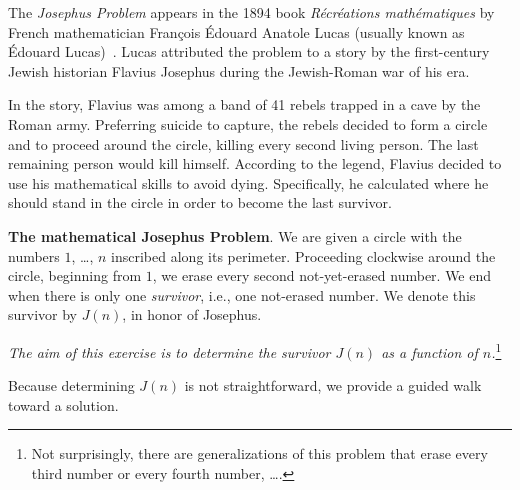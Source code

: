 \begin{enumerate}
The {\it Josephus Problem} appears in the 1894 book \textit{R\'ecr\'eations math\'ematiques} by 
French mathematician Fran\c{c}ois \'{E}douard Anatole Lucas (usually known as \'{E}douard Lucas)~\cite{Lucas}.  Lucas attributed the problem to a story by the first-century Jewish historian Flavius Josephus during the Jewish-Roman war of his era.

\smallskip

In the story, Flavius was among a band of 41 rebels trapped in a cave by the Roman army.  Preferring suicide to capture, the rebels decided to form a circle and to proceed around the circle, killing every second living person.  The last remaining person would kill himself.  According to the legend, Flavius decided to use his mathematical skills to avoid dying.  Specifically, he calculated where he should stand in the circle in order to become the last survivor.

\medskip

{\bf  The  mathematical Josephus Problem}.
We are given a circle with the numbers $1$, \ldots, $n$ inscribed along its perimeter.  Proceeding clockwise around the circle, beginning from $1$, we erase every second not-yet-erased number.  We end when there is only one {\it survivor}, i.e., one not-erased number.  We denote this survivor by $J(n)$, in honor of Josephus.


\medskip

{\em The aim of this exercise is to determine the survivor $J(n)$ as a function of $n$.}\footnote{Not surprisingly, there are generalizations of this problem that erase every third number or every fourth number, \ldots .}

\medskip

Because determining $J(n)$ is not straightforward, we provide a guided walk toward a solution.

\smallskip   


\end{enumerate}
